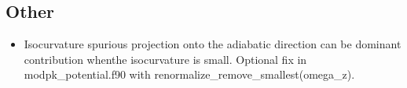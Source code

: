 \documentclass[11pt]{article}
\begin{document}
\subsection{Other}

\begin{itemize}

  \item Isocurvature spurious projection onto the adiabatic direction can be dominant contribution whenthe isocurvature is small.  Optional fix in modpk\_potential.f90 with renormalize\_remove\_smallest(omega\_z).


\end{itemize}






\end{document}
